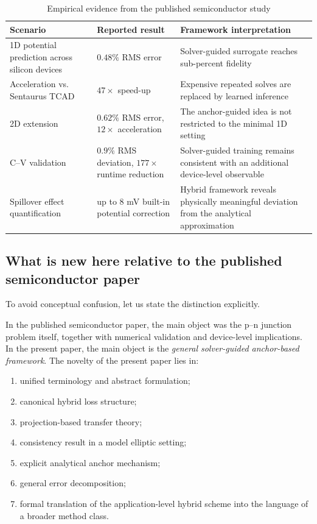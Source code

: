 \documentclass[preprint,12pt]{elsarticle}
\theoremstyle{definition}
\numberwithin{equation}{section}
\begin{document}
\begin{table}[H]
\centering
\caption{Empirical evidence from the published semiconductor study}
\label{tab:published_results}
\renewcommand{\arraystretch}{1.25}
\begin{tabular}{p{4.1cm}p{3.0cm}p{6.9cm}}
\toprule
\textbf{Scenario} & \textbf{Reported result} & \textbf{Framework interpretation} \\
\midrule
1D potential prediction across silicon devices & $0.48\%$ RMS error & Solver-guided surrogate reaches sub-percent fidelity \\
\addlinespace
Acceleration vs. Sentaurus TCAD & $47\times$ speed-up & Expensive repeated solves are replaced by learned inference \\
\addlinespace
2D extension & $0.62\%$ RMS error, $12\times$ acceleration & The anchor-guided idea is not restricted to the minimal 1D setting \\
\addlinespace
C--V validation & $0.9\%$ RMS deviation, $177\times$ runtime reduction & Solver-guided training remains consistent with an additional device-level observable \\
\addlinespace
Spillover effect quantification & up to $8$ mV built-in potential correction & Hybrid framework reveals physically meaningful deviation from the analytical approximation \\
\bottomrule
\end{tabular}
\end{table}

\subsection*{What is new here relative to the published semiconductor paper}

To avoid conceptual confusion, let us state the distinction explicitly.

In the published semiconductor paper, the main object was the p--n junction problem itself, together with numerical validation and device-level implications. In the present paper, the main object is the \emph{general solver-guided anchor-based framework}. The novelty of the present paper lies in:
\begin{enumerate}[label=\alph*)]
    \item unified terminology and abstract formulation;
    \item canonical hybrid loss structure;
    \item projection-based transfer theory;
    \item consistency result in a model elliptic setting;
    \item explicit analytical anchor mechanism;
    \item general error decomposition;
    \item formal translation of the application-level hybrid scheme into the language of a broader method class.
\end{enumerate}
\end{document}
